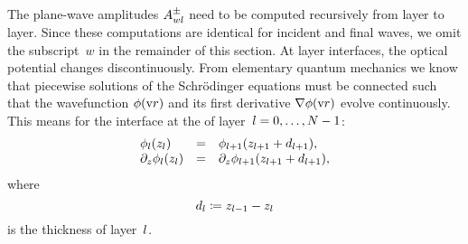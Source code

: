 The plane-wave amplitudes $A^\pm_{wl}$ need to be computed recursively
from layer to layer.
Since these computations are identical for incident and final waves,
we omit the subscript~$w$ in the remainder of this section.
At layer interfaces, the optical potential changes discontinuously.
From elementary quantum mechanics we know that
piecewise solutions of the Schrödinger equations must be connected
such that the wavefunction $\phi(\text{v}{r})$ and its first derivative
$\mathbf{\nabla}\phi(\text{v}{r})$ evolve continuously.
This means for the interface
at the  of layer~$l=0,\ldots,N-1$:%
\begin{equation}\label{Econtcond}
  \begin{array}{lcl}
            \phi_l(z_l)&=&\phi_{l+1}(z_{l+1}+d_{l+1}),\\
            \partial_z\phi_l(z_l)&=&\partial_z\phi_{l+1}(z_{l+1}+d_{l+1}),
  \end{array}
\end{equation}
  where
\begin{equation}
  d_l\coloneqq z_{l-1}-z_{l}
\end{equation}
is the thickness of layer~$l$.

